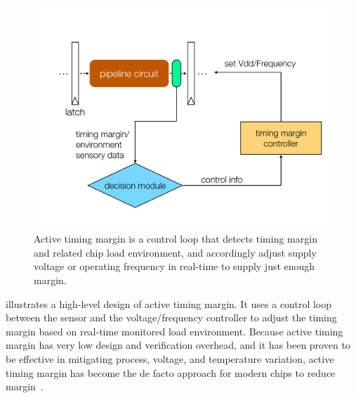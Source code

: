 \begin{figure}[t!]
\centering 
  \includegraphics[trim=0 0 0 0,clip,width=0.9\linewidth]{graphs/background/atm.pdf}
  \caption{Active timing margin is a control loop that detects timing margin and related chip load environment, and accordingly adjust supply voltage or operating frequency in real-time to supply just enough margin.}
  \label{fig:atm-example}
\vspace{-0.2in}
\end{figure}

 illustrates a high-level design of active timing margin. It uses a control loop between the sensor and the voltage/frequency controller to adjust the timing margin based on real-time monitored load environment. Because active timing margin has very low design and verification overhead, and it has been proven to be effective in mitigating process, voltage, and temperature variation, active timing margin has become the de facto approach for modern chips to reduce margin~\cite{lefurgy2011active, bowman201222nm, tokunaga20145,grenat20145,bowman20158,webel2015robust,vezyrtzis2018droop,zu2016tistate}.

